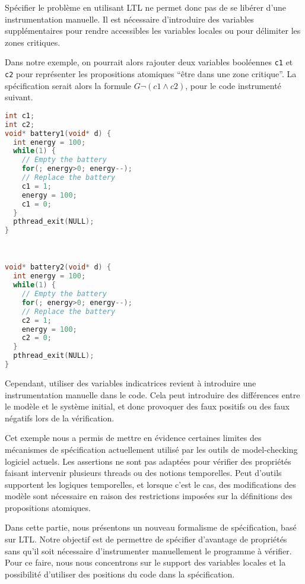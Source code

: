 Spécifier le problème en utilisant LTL ne permet donc pas de se libérer
d'une instrumentation manuelle. Il est nécessaire d'introduire des
variables supplémentaires pour rendre accessibles les variables locales
ou pour délimiter les zones critiques.

Dans notre exemple, on pourrait alors rajouter deux variables booléennes
\texttt{c1} et \texttt{c2} pour représenter les propositions atomiques
``être dans une zone critique''. La spécification serait alors
la formule \(G \lnot (c1 \land c2)\), pour le code instrumenté suivant.

\noindent\begin{minipage}{.45\textwidth}
\begin{lstlisting}[language=C, frame=single, caption=Thread 1]
int c1;
int c2;
void* battery1(void* d) {
  int energy = 100;
  while(1) {
    // Empty the battery
    for(; energy>0; energy--);
    // Replace the battery
    c1 = 1;
    energy = 100;
    c1 = 0;
  }
  pthread_exit(NULL);
}
\end{lstlisting}
\end{minipage}\hfill
\begin{minipage}{.45\textwidth}
\begin{lstlisting}[language=C, frame=single, caption=Thread 1]


void* battery2(void* d) {
  int energy = 100;
  while(1) {
    // Empty the battery
    for(; energy>0; energy--);
    // Replace the battery
    c2 = 1;
    energy = 100;
    c2 = 0;
  }
  pthread_exit(NULL);
}
\end{lstlisting}
\end{minipage}

Cependant, utiliser des variables indicatrices revient à introduire une
instrumentation manuelle dans le code. Cela peut introduire des
différences entre le modèle et le système initial, et donc provoquer des
faux positifs ou des faux négatifs lors de la vérification.

Cet exemple nous a permis de mettre en évidence certaines limites des mécanismes
de spécification actuellement utilisé par les outils de model-checking logiciel
actuels. Les assertions ne sont pas adaptées pour vérifier des propriétés
faisant intervenir plusieurs threads ou des notions temporelles. Peut d'outils
supportent les logiques temporelles, et lorsque c'est le cas, des modifications
des modèle sont nécessaire en raison des restrictions imposées sur la
définitions des propositions atomiques.

Dans cette partie, nous présentons un nouveau formalisme de spécification, basé
sur LTL. Notre objectif est de permettre de spécifier d'avantage de propriétés
sans qu'il soit nécessaire d'instrumenter manuellement le programme à vérifier.
Pour ce faire, nous nous concentrons sur le support des variables locales et la
possibilité d'utiliser des positions du code dans la spécification.
